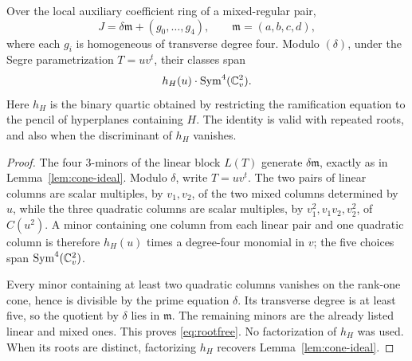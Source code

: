 \begin{lemma}
\label{lem:rootfree}
Over the local auxiliary coefficient ring of a mixed-regular pair,
\begin{equation}\label{eq:rootfree}
 J=\delta\mathfrak m+(g_0,\ldots,g_4),
 \qquad
 \mathfrak m=(a,b,c,d),
\end{equation}
where each $g_i$ is homogeneous of transverse degree four.
Modulo $(\delta)$, under the Segre parametrization $T=uv^t$, their
classes span
\[
 h_H(u)\cdot\operatorname{Sym}^4(\mathbb C^2_v).
\]
Here $h_H$ is the binary quartic obtained by restricting the
ramification equation to the pencil of hyperplanes containing $H$.
The identity is valid with repeated roots, and also when the
discriminant of $h_H$ vanishes.
\end{lemma}
\begin{proof}
The four $3$-minors of the linear block $L(T)$ generate
$\delta\mathfrak m$, exactly as in
Lemma~\ref{lem:cone-ideal}.  Modulo $\delta$, write $T=uv^t$.
The two pairs of linear columns are scalar multiples, by $v_1,v_2$,
of the two mixed columns determined by $u$, while the three quadratic
columns are scalar multiples, by
$v_1^2,v_1v_2,v_2^2$, of $C(u^2)$.  A minor containing one column
from each linear pair and one quadratic column is therefore
$h_H(u)$ times a degree-four monomial in $v$; the five choices span
$\operatorname{Sym}^4(\mathbb C^2_v)$.

Every minor containing at least two quadratic columns vanishes on the
rank-one cone, hence is divisible by the prime equation $\delta$.
Its transverse degree is at least five, so the quotient by $\delta$
lies in $\mathfrak m$.  The remaining minors are the already listed
linear and mixed ones.  This proves \eqref{eq:rootfree}.  No
factorization of $h_H$ was used.  When its roots are distinct,
factorizing $h_H$ recovers Lemma~\ref{lem:cone-ideal}.
\end{proof}

